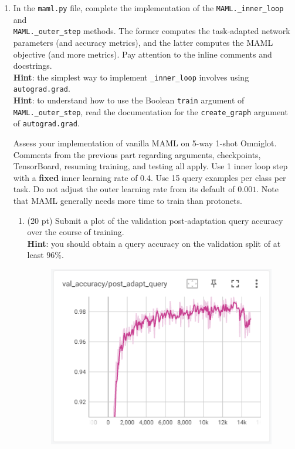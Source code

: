 \documentclass[12pt]{article}
\begin{document}
    \begin{enumerate}
        \item In the \texttt{maml.py} file, complete the implementation of the \texttt{MAML.\_inner\_loop} and \\ \texttt{MAML.\_outer\_step} methods. The former computes the task-adapted network parameters (and accuracy metrics), and the latter computes the MAML objective (and more metrics). Pay attention to the inline comments and docstrings. \\
        \textbf{Hint}: the simplest way to implement \texttt{\_inner\_loop} involves using \texttt{autograd.grad}. \\
        \textbf{Hint}: to understand how to use the Boolean \texttt{train} argument of \texttt{MAML.\_outer\_step}, read the documentation for the \texttt{create\_graph} argument of \texttt{autograd.grad}.

        Assess your implementation of vanilla MAML on 5-way 1-shot Omniglot. Comments from the previous part regarding arguments, checkpoints, TensorBoard, resuming training, and testing all apply. Use 1 inner loop step with a \textbf{fixed} inner learning rate of 0.4. Use 15 query examples per class per task. Do not adjust the outer learning rate from its default of $0.001$. Note that MAML generally needs more time to train than protonets.
        \begin{enumerate}
            \newpage
            \item (20 pt) Submit a plot of the validation post-adaptation query accuracy over the course of training. \\
            \textbf{Hint}: you should obtain a query accuracy on the validation split of at least $96\%$.

            \begin{figure}[H]
                \centering
                \includegraphics[width=\linewidth]{figures/maml_validation_query_accuracy.png}
            \end{figure}


\end{enumerate}
\end{enumerate}
\end{document}
